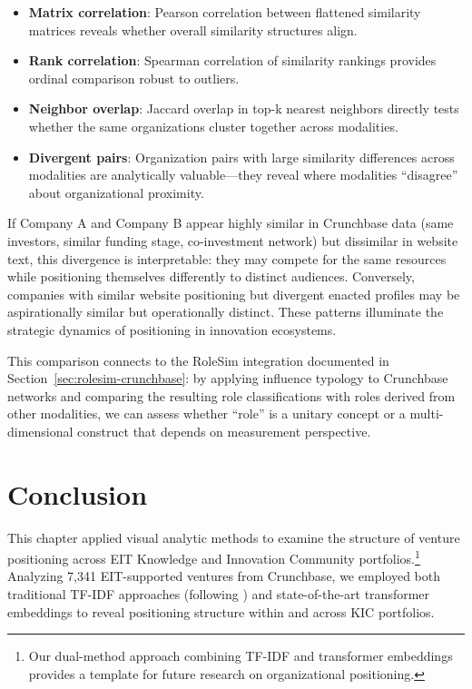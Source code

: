 \documentclass[../main.tex]{subfiles}
\begin{document}
\begin{itemize}[leftmargin=*, itemsep=0.2em]
\item \textbf{Matrix correlation}: Pearson correlation between flattened similarity matrices reveals whether overall similarity structures align.
\item \textbf{Rank correlation}: Spearman correlation of similarity rankings provides ordinal comparison robust to outliers.
\item \textbf{Neighbor overlap}: Jaccard overlap in top-k nearest neighbors directly tests whether the same organizations cluster together across modalities.
\item \textbf{Divergent pairs}: Organization pairs with large similarity differences across modalities are analytically valuable---they reveal where modalities ``disagree'' about organizational proximity.
\end{itemize}

\begin{insightbox}
If Company A and Company B appear highly similar in Crunchbase data (same investors, similar funding stage, co-investment network) but dissimilar in website text, this divergence is interpretable: they may compete for the same resources while positioning themselves differently to distinct audiences. Conversely, companies with similar website positioning but divergent enacted profiles may be aspirationally similar but operationally distinct. These patterns illuminate the strategic dynamics of positioning in innovation ecosystems.
\end{insightbox}

\noindent This comparison connects to the RoleSim integration documented in Section~\ref{sec:rolesim-crunchbase}: by applying influence typology to Crunchbase networks and comparing the resulting role classifications with roles derived from other modalities, we can assess whether ``role'' is a unitary concept or a multi-dimensional construct that depends on measurement perspective.

\section{Conclusion}

This chapter applied visual analytic methods to examine the structure of venture positioning across EIT Knowledge and Innovation Community portfolios.\footnote{Our dual-method approach combining TF-IDF and transformer embeddings provides a template for future research on organizational positioning.} Analyzing 7,341 EIT-supported ventures from Crunchbase, we employed both traditional TF-IDF approaches (following \cite{basole2019visual}) and state-of-the-art transformer embeddings to reveal positioning structure within and across KIC portfolios.
\end{document}
